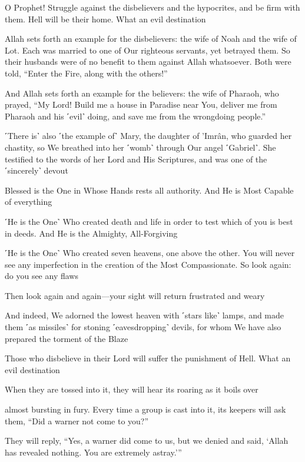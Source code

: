 O Prophet! Struggle against the disbelievers and the hypocrites, and be firm with them. Hell will be their home. What an evil destination

Allah sets forth an example for the disbelievers: the wife of Noah and the wife of Lot. Each was married to one of Our righteous servants, yet betrayed them. So their husbands were of no benefit to them against Allah whatsoever. Both were told, “Enter the Fire, along with the others!”

And Allah sets forth an example for the believers: the wife of Pharaoh, who prayed, “My Lord! Build me a house in Paradise near You, deliver me from Pharaoh and his ˹evil˺ doing, and save me from the wrongdoing people.”

˹There is˺ also ˹the example of˺ Mary, the daughter of ’Imrân, who guarded her chastity, so We breathed into her ˹womb˺ through Our angel ˹Gabriel˺. She testified to the words of her Lord and His Scriptures, and was one of the ˹sincerely˺ devout

Blessed is the One in Whose Hands rests all authority. And He is Most Capable of everything

˹He is the One˺ Who created death and life in order to test which of you is best in deeds. And He is the Almighty, All-Forgiving

˹He is the One˺ Who created seven heavens, one above the other. You will never see any imperfection in the creation of the Most Compassionate. So look again: do you see any flaws

Then look again and again—your sight will return frustrated and weary

And indeed, We adorned the lowest heaven with ˹stars like˺ lamps, and made them ˹as missiles˺ for stoning ˹eavesdropping˺ devils, for whom We have also prepared the torment of the Blaze

Those who disbelieve in their Lord will suffer the punishment of Hell. What an evil destination

When they are tossed into it, they will hear its roaring as it boils over

almost bursting in fury. Every time a group is cast into it, its keepers will ask them, “Did a warner not come to you?”

They will reply, “Yes, a warner did come to us, but we denied and said, ‘Allah has revealed nothing. You are extremely astray.’”

